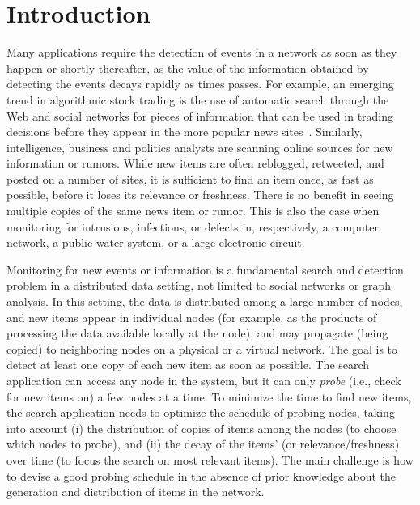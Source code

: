 \section{Introduction}\label{sec:introduction}
Many applications require the detection of events in a network as soon as they
happen or shortly thereafter, as the value of the information obtained by
detecting the events decays rapidly as times passes. For example, an emerging
trend in algorithmic stock trading is the use of automatic search through the
Web and social networks for pieces of information that can be used in trading
decisions before they appear in the more popular news
sites~\citep{Delaney2009,latar2015robot,wallstreet2015,McKinney2011}. Similarly,
intelligence, business and politics analysts are scanning online sources for new
information or rumors. While new items are often reblogged, retweeted, and
posted on a number of sites, it is sufficient to find an item once, as fast as
possible, before it loses its relevance or freshness. There is no benefit in seeing multiple
copies of the same news item or rumor. This is also the case when monitoring for
intrusions, infections, or defects in, respectively, a computer network, a
public water system, or a large electronic circuit.

Monitoring for new events or information is a fundamental search and detection
problem in a distributed data setting, not limited to social networks or graph
analysis. In this setting, the data is distributed among a large number of
nodes, and new items appear in individual nodes (for example, as the products of
processing the data available locally at the node), and may propagate (being
copied) to neighboring nodes on a physical or a virtual network. The goal is to
detect at least one copy of each new item as soon as possible. The search
application can access any node in the system, but it can only \emph{probe}
(i.e., check for new items on) a few nodes at a time. To minimize the time to
find new items, the search application needs to optimize the schedule of probing
nodes, taking into account (i) the distribution of copies of items among the
nodes (to choose which nodes to probe), and (ii) the decay of the items'
\emph{} (or relevance/freshness) over time (to focus the search on most
relevant items). The main challenge is how to devise a good probing schedule in
the absence of prior knowledge about the generation and distribution of items in
the network.


